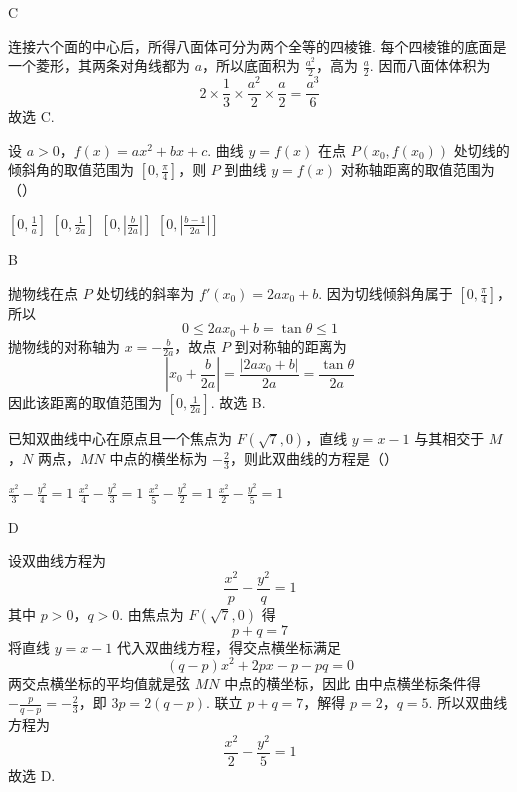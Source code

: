 \begin{answer}
C
\end{answer}

\begin{solution}
连接六个面的中心后，所得八面体可分为两个全等的四棱锥. 每个四棱锥的底面是一个菱形，其两条对角线都为 \(a\)，所以底面积为 \(\frac{a^2}{2}\)，高为 \(\frac a2\). 因而八面体体积为
\[
2\times\frac13\times\frac{a^2}{2}\times\frac a2=\frac{a^3}{6}
\]
故选 C.
\end{solution}

\begin{problem}
设 \(a > 0\)，\(f(x) = ax^2 + bx + c\). 曲线 \(y = f(x)\) 在点 \(P(x_0, f(x_0))\) 处切线的倾斜角的取值范围为 \(\left[0, \frac{\pi}{4}\right]\)，则 \(P\) 到曲线 \(y = f(x)\) 对称轴距离的取值范围为（\quad）

\choices
    {\(\left[0, \frac{1}{a}\right]\)}
    {\(\left[0, \frac{1}{2a}\right]\)}
    {\(\left[0, \left|\frac{b}{2a}\right|\right]\)}
    {\(\left[0, \left|\frac{b - 1}{2a}\right|\right]\)}
\end{problem}

\begin{answer}
B
\end{answer}

\begin{solution}
抛物线在点 \(P\) 处切线的斜率为 \(f'(x_0)=2ax_0+b\). 因为切线倾斜角属于 \(\left[0,\frac\pi4\right]\)，所以
\[
0\leqslant2ax_0+b=\tan\theta\leqslant1
\]
抛物线的对称轴为 \(x=-\frac{b}{2a}\)，故点 \(P\) 到对称轴的距离为
\[
\left|x_0+\frac{b}{2a}\right|=\frac{|2ax_0+b|}{2a}=\frac{\tan\theta}{2a}
\]
因此该距离的取值范围为 \(\left[0,\frac{1}{2a}\right]\). 故选 B.
\end{solution}

\begin{problem}
已知双曲线中心在原点且一个焦点为 \(F(\sqrt{7}, 0)\)，直线 \(y = x - 1\) 与其相交于 \(M\)，\(N\) 两点，\(MN\) 中点的横坐标为 \(-\frac{2}{3}\)，则此双曲线的方程是（\quad）

\choices
    {\(\frac{x^2}{3} - \frac{y^2}{4} = 1\)}
    {\(\frac{x^2}{4} - \frac{y^2}{3} = 1\)}
    {\(\frac{x^2}{5} - \frac{y^2}{2} = 1\)}
    {\(\frac{x^2}{2} - \frac{y^2}{5} = 1\)}
\end{problem}

\begin{answer}
D
\end{answer}

\begin{solution}
设双曲线方程为
\[
\frac{x^2}{p}-\frac{y^2}{q}=1
\]
其中 \(p>0\)，\(q>0\).
由焦点为 \(F(\sqrt7,0)\) 得
\[
p+q=7
\]
将直线 \(y=x-1\) 代入双曲线方程，得交点横坐标满足
\[
(q-p)x^2+2px-p-pq=0
\]
两交点横坐标的平均值就是弦 \(MN\) 中点的横坐标，因此
由中点横坐标条件得 \(-\frac{p}{q-p}=-\frac23\)，即 \(3p=2(q-p)\).
联立 \(p+q=7\)，解得 \(p=2\)，\(q=5\). 所以双曲线方程为
\[
\frac{x^2}{2}-\frac{y^2}{5}=1
\]
故选 D.
\end{solution}

